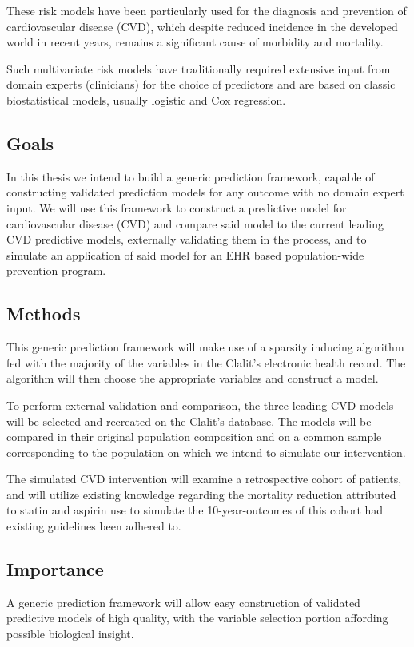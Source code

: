 \documentclass[a4paper,12pt]{article}
\begin{document}
		These risk models have been particularly used for the diagnosis and prevention of cardiovascular disease (CVD), which despite reduced incidence in the developed world in recent years\cite{Koton2014,Vangen-Loenne2017}, remains a significant cause of morbidity and mortality\cite{ODonnell2016}.
		
		Such multivariate risk models have traditionally required extensive input from domain experts (clinicians) for the choice of predictors and are based on classic biostatistical models, usually logistic and Cox regression.
		
		\subsection{Goals}
		In this thesis we intend to build a generic prediction framework, capable of constructing validated prediction models for any outcome with no domain expert input. We will use this framework to construct a predictive model for cardiovascular disease (CVD) and compare said model to the current leading CVD predictive models, externally validating them in the process, and to simulate an application of said model for an EHR based population-wide prevention program.

		\subsection{Methods}
		This generic prediction framework will make use of a sparsity inducing algorithm fed with the majority of the variables in the Clalit's electronic health record. The algorithm will then choose the appropriate variables and construct a model.
		
		To perform external validation and comparison, the three leading CVD models will be selected and recreated on the Clalit's database. The models will be compared in their original population composition and on a common sample corresponding to the population on which we intend to simulate our intervention.
		
		The simulated CVD intervention will examine a retrospective cohort of patients, and will utilize existing knowledge regarding the mortality reduction attributed to statin and aspirin use to simulate the 10-year-outcomes of this cohort had existing guidelines been adhered to.
		
		\subsection{Importance}
		A generic prediction framework will allow easy construction of validated predictive models of high quality, with the variable selection portion affording possible biological insight.
		
\end{document}
